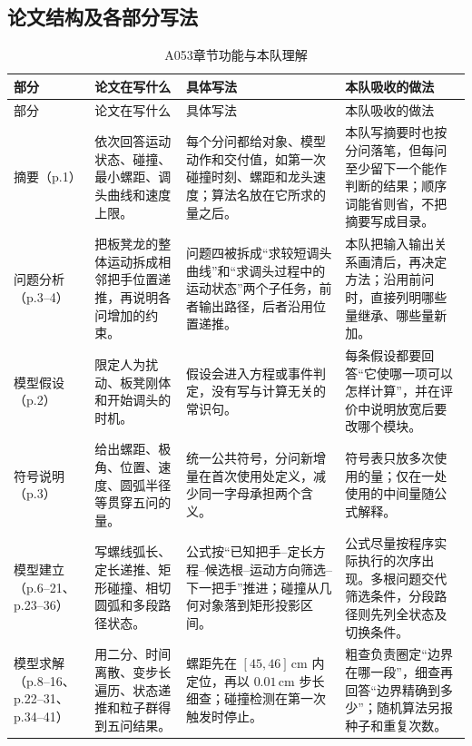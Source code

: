 \documentclass[UTF8,zihao=-4]{ctexart}
\begin{document}
\subsection{论文结构及各部分写法}

\small
\begin{longtable}{p{2.25cm}p{4.0cm}p{5.1cm}p{4.2cm}}
\caption{A053章节功能与本队理解}\label{tab:a053-structure}\\
\toprule
部分 & 论文在写什么 & 具体写法 & 本队吸收的做法\\
\midrule
\endfirsthead
\toprule
部分 & 论文在写什么 & 具体写法 & 本队吸收的做法\\
\midrule
\endhead
\bottomrule
\endfoot
摘要（p.1）
& 依次回答运动状态、碰撞、最小螺距、调头曲线和速度上限。
& 每个分问都给对象、模型动作和交付值，如第一次碰撞时刻、螺距和龙头速度；算法名放在它所求的量之后。
& 本队写摘要时也按分问落笔，但每问至少留下一个能作判断的结果；顺序词能省则省，不把摘要写成目录。\\

问题分析（p.3--4）
& 把板凳龙的整体运动拆成相邻把手位置递推，再说明各问增加的约束。
& 问题四被拆成“求较短调头曲线”和“求调头过程中的运动状态”两个子任务，前者输出路径，后者沿用位置递推。
& 本队把输入输出关系画清后，再决定方法；沿用前问时，直接列明哪些量继承、哪些量新加。\\

模型假设（p.2）
& 限定人为扰动、板凳刚体和开始调头的时机。
& 假设会进入方程或事件判定，没有写与计算无关的常识句。
& 每条假设都要回答“它使哪一项可以怎样计算”，并在评价中说明放宽后要改哪个模块。\\

符号说明（p.3）
& 给出螺距、极角、位置、速度、圆弧半径等贯穿五问的量。
& 统一公共符号，分问新增量在首次使用处定义，减少同一字母承担两个含义。
& 符号表只放多次使用的量；仅在一处使用的中间量随公式解释。\\

模型建立（p.6--21、p.23--36）
& 写螺线弧长、定长递推、矩形碰撞、相切圆弧和多段路径状态。
& 公式按“已知把手--定长方程--候选根--运动方向筛选--下一把手”推进；碰撞从几何对象落到矩形投影区间。
& 公式尽量按程序实际执行的次序出现。多根问题交代筛选条件，分段路径则先列全状态及切换条件。\\

模型求解（p.8--16、p.22--31、p.34--41）
& 用二分、时间离散、变步长遍历、状态递推和粒子群得到五问结果。
& 螺距先在 $[45,46]\,\mathrm{cm}$ 内定位，再以 $0.01\,\mathrm{cm}$ 步长细查；碰撞检测在第一次触发时停止。
& 粗查负责圈定“边界在哪一段”，细查再回答“边界精确到多少”；随机算法另报种子和重复次数。\\


\end{longtable}
\end{document}
